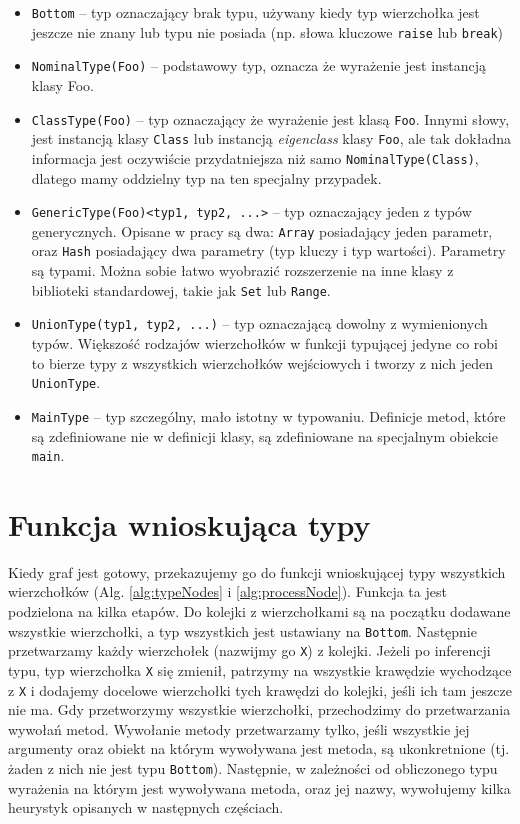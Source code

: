 \documentclass[declaration,shortabstract,mgr]{iithesis}
\begin{document}
\begin{itemize}
 \item \texttt{Bottom} -- typ oznaczający brak typu, używany kiedy typ wierzchołka jest jeszcze nie znany lub typu nie posiada (np. słowa kluczowe \texttt{raise} lub \texttt{break})
 \item \texttt{NominalType(Foo)} -- podstawowy typ, oznacza że wyrażenie jest instancją klasy Foo.
 \item \texttt{ClassType(Foo)} -- typ oznaczający że wyrażenie jest klasą \texttt{Foo}. Innymi słowy, jest instancją klasy \texttt{Class} lub instancją \textit{eigenclass} klasy \texttt{Foo}, ale tak dokładna informacja jest oczywiście przydatniejsza niż samo \texttt{NominalType(Class)}, dlatego mamy oddzielny typ na ten specjalny przypadek.
 \item \texttt{GenericType(Foo)<typ1, typ2, ...>} -- typ oznaczający jeden z typów generycznych. Opisane w pracy są dwa: \texttt{Array} posiadający jeden parametr, oraz \texttt{Hash} posiadający dwa parametry (typ kluczy i typ wartości). Parametry są typami. Można sobie łatwo wyobrazić rozszerzenie na inne klasy z biblioteki standardowej, takie jak \texttt{Set} lub \texttt{Range}.
 \item \texttt{UnionType(typ1, typ2, ...)} -- typ oznaczającą dowolny z wymienionych typów. Większość rodzajów wierzchołków w funkcji typującej jedyne co robi to bierze typy z wszystkich wierzchołków wejściowych i tworzy z nich jeden \texttt{UnionType}.
 \item \texttt{MainType} -- typ szczególny, mało istotny w typowaniu. Definicje metod, które są zdefiniowane nie w definicji klasy, są zdefiniowane na specjalnym obiekcie \texttt{main}.
\end{itemize}



\section{Funkcja wnioskująca typy}

Kiedy graf jest gotowy, przekazujemy go do funkcji wnioskującej typy wszystkich wierzchołków (Alg. \ref{alg:typeNodes} i \ref{alg:processNode}). Funkcja ta jest podzielona na kilka etapów.
Do kolejki z wierzchołkami są na początku dodawane wszystkie wierzchołki, a typ wszystkich jest ustawiany na \texttt{Bottom}.
Następnie przetwarzamy każdy wierzchołek (nazwijmy go \texttt{X}) z kolejki.
Jeżeli po inferencji typu, typ wierzchołka \texttt{X} się zmienił, patrzymy na wszystkie krawędzie wychodzące z \texttt{X} i dodajemy docelowe wierzchołki tych krawędzi do kolejki, jeśli ich tam jeszcze nie ma.
Gdy przetworzymy wszystkie wierzchołki, przechodzimy do przetwarzania wywołań metod.
Wywołanie metody przetwarzamy tylko, jeśli wszystkie jej argumenty oraz obiekt na którym wywoływana jest metoda, są ukonkretnione (tj. żaden z nich nie jest typu \texttt{Bottom}).
Następnie, w zależności od obliczonego typu wyrażenia na którym jest wywoływana metoda, oraz jej nazwy, wywołujemy kilka heurystyk opisanych w następnych częściach.
\end{document}
